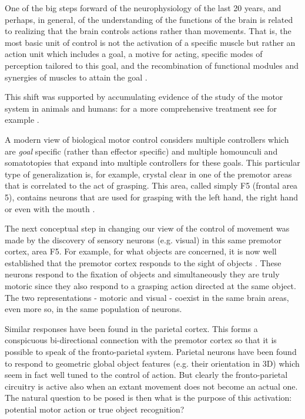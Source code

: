 
One of the big steps forward of the neurophysiology of the last 20 years, 
and perhaps, in general, of the understanding of the functions of the brain 
is related to realizing that the brain controls actions rather than 
movements. That is, the most basic unit of control is not the activation 
of a specific muscle but rather an action unit which includes a goal, a 
motive for acting, specific modes of perception tailored to this goal, and the
recombination of functional modules and synergies of muscles to attain
the goal \cite{vonhoftsen04tics}.

This shift was supported by accumulating evidence of the study of
the motor system in animals and humans: for a more comprehensive treatment 
see for example \cite{rizzolatti88book, rizzolatti04review}. 

A modern view of biological motor control considers multiple controllers
which are {\em goal} specific (rather than effector specific) and multiple
homounculi and somatotopies that expand into multiple controllers for 
these goals. This particular type of generalization is, for example, 
crystal clear in one of the premotor areas that is correlated to the act 
of grasping. This area, called simply F5 (frontal area 5), contains neurons 
that are used for grasping with the left hand, the right hand or even with the 
mouth \cite{gallese96brain}. 
 
The next conceptual step in changing our view of the control of movement 
was made by the discovery of sensory neurons (e.g. visual) in this same
premotor cortex, area F5. For example, for what objects are concerned, 
it is now well established that the premotor cortex responds to the sight 
of objects \cite{gallese96brain}. These neurons respond to the fixation 
of objects and simultaneously they are truly motoric since they also 
respond to a grasping action directed at the same object. The two 
representations - motoric and visual - coexist in the same brain areas, 
even more so, in the same population of neurons.

Similar responses have been found in the parietal cortex. This forms a 
conspicuous bi-directional connection with the premotor cortex so that it 
is possible to speak of the fronto-parietal system. Parietal neurons have been 
found to respond to geometric global object features (e.g. their orientation 
in 3D) which seem in fact well tuned to the control of action. But clearly 
the fronto-parietal circuitry is active also when an extant movement does 
not become an actual one. The natural question to be posed is then what is 
the purpose of this activation: potential motor action or true object 
recognition?

